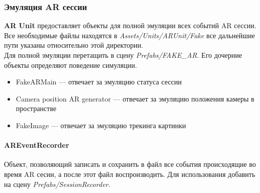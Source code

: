\documentclass[a4paper, 11pt, titlepage]{article}
\begin{document}
      \subsubsection{Эмуляция AR сессии}
        \textbf{AR Unit} предоставляет объекты для полной эмуляции всех событий AR сессии.\\
        Все необходимые файлы находятся в \textit{Assets/Units/ARUnit/Fake} все дальнейшие пути указаны относительно этой директории.\\
        Для полной эмуляции перетащить в сцену \textit{Prefabs/FAKE\_AR}. Его дочерние объекты определяют поведение симуляции.
        \begin{itemize}
          \item FakeARMain --- отвечает за эмуляцию статуса сессии
          \item Camera position AR generator --- отвечает за эмуляцию положения камеры в пространстве
          \item FakeImage --- отвечает за эмуляцию трекинга картинки
        \end{itemize} 

      \paragraph{AREventRecorder}
        Объект, позволяющий записать и сохранить в файл все события происходящие во время AR сесии, а после 
        этот файл воспроизводить.
        Для использования добавить на сцену \textit{Prefabs/SessionRecorder}.
\end{document}
